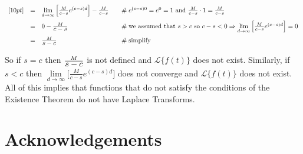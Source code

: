 \documentclass{article}
\theoremstyle{definition}
\begin{document}
\begin{equation*}
\begin{array}{lllll}
[10pt]                                                                                %
&=& \lim\limits_{d \to \infty}\Big [\frac{M}{c-s} e^{(c-s)d} \Big ] - \frac{M}{c - s}                 &\quad  \mathrel{\#} e^{(c-s)0} = e^0 = 1 \text{ and } \frac{M}{c-s} \cdot 1 = \frac{M}{c-s}                                   \\
[10pt]                                                                                %
&=& 0 - \frac{M} {\mathlarger{c-s}}                                   &\quad  \mathrel{\#} \text{we assumed that $s > c$ so $c -s < 0 \Rightarrow  \lim\limits_{d \to \infty}\Big [\frac{M}{c-s} e^{(c-s)d} \Big ] = 0$}   \\    
[10pt]                                                                                %
&=& \frac{M}{\mathlarger{s-c}}                                         &\quad  \mathrel{\#} \text{simplify} 
\end{array}
\end{equation*}

\bigskip
\noindent
So if $s = c$ then $\frac{M}{\mathlarger{s-c}}$ is not defined and $\mathcal{L}\{f(t)\}$ does not exist. Similarly, if $s < c$ then $\lim\limits_{d \to \infty}\Big [\frac{M}{c-s} e^{(c-s)d} \Big ]$ 
does not converge and $\mathcal{L}\{f(t)\}$ does not exist. All of this implies that functions that do not satisfy the conditions of the Existence Theorem do not have Laplace Transforms.

\bigskip
\section*{Acknowledgements}

\newpage


\end{document}
